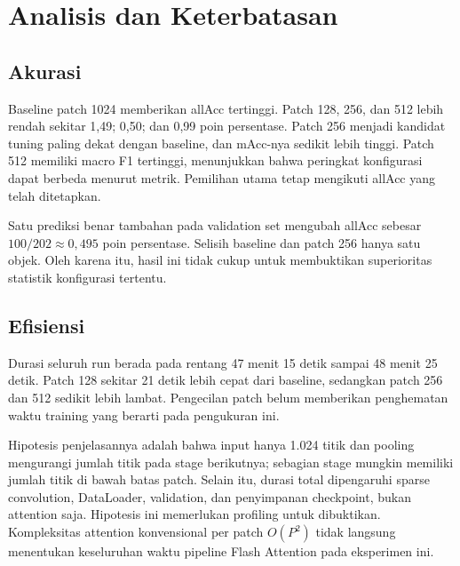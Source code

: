 \documentclass[11pt,a4paper]{article}
\begin{document}
\section{Analisis dan Keterbatasan}
\subsection{Akurasi}
Baseline patch 1024 memberikan allAcc tertinggi. Patch 128, 256, dan
512 lebih rendah sekitar 1,49; 0,50; dan 0,99 poin persentase.
Patch 256 menjadi kandidat tuning paling dekat dengan baseline, dan
mAcc-nya sedikit lebih tinggi. Patch 512 memiliki macro F1 tertinggi,
menunjukkan bahwa peringkat konfigurasi dapat berbeda menurut metrik.
Pemilihan utama tetap mengikuti allAcc yang telah ditetapkan.

Satu prediksi benar tambahan pada validation set mengubah allAcc sebesar
$100/202\approx0,495$ poin persentase. Selisih baseline dan patch 256
hanya satu objek. Oleh karena itu, hasil ini tidak cukup untuk membuktikan
superioritas statistik konfigurasi tertentu.

\subsection{Efisiensi}
Durasi seluruh run berada pada rentang 47 menit 15 detik sampai
48 menit 25 detik. Patch 128 sekitar 21 detik lebih cepat dari baseline,
sedangkan patch 256 dan 512 sedikit lebih lambat. Pengecilan patch belum
memberikan penghematan waktu training yang berarti pada pengukuran ini.

Hipotesis penjelasannya adalah bahwa input hanya 1.024 titik dan pooling
mengurangi jumlah titik pada stage berikutnya; sebagian stage mungkin
memiliki jumlah titik di bawah batas patch. Selain itu, durasi total
dipengaruhi sparse convolution, DataLoader, validation, dan penyimpanan
checkpoint, bukan attention saja. Hipotesis ini memerlukan profiling
untuk dibuktikan. Kompleksitas attention konvensional per patch
$O(P^2)$ tidak langsung menentukan keseluruhan waktu pipeline Flash
Attention pada eksperimen ini.
\end{document}
